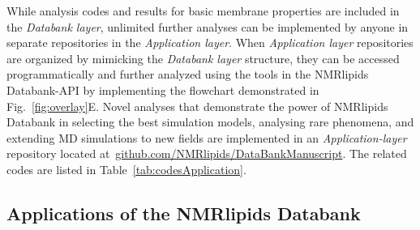 \documentclass[fleqn,10pt]{wlscirep}
\begin{document}
While analysis codes and results for basic membrane properties 
are included in the {\it Databank layer}, unlimited further analyses can be implemented by anyone in separate repositories in the {\it Application layer}. When {\it Application layer} repositories are organized by mimicking the {\it Databank layer} structure, they can be accessed programmatically and further analyzed using the tools in the NMRlipids Databank-API by implementing the flowchart demonstrated in Fig.~\ref{fig:overlay}E. Novel analyses that demonstrate the power of NMRlipids Databank in selecting the best simulation models, analysing rare phenomena, and extending MD simulations to new fields are implemented in an {\it Application-layer} repository located at~\href{https://github.com/NMRlipids/DataBankManuscript}{github.com/NMRlipids/DataBankManuscript}. The related codes are listed in Table~\ref{tab:codesApplication}.


\subsection{Applications of the NMRlipids Databank}
\end{document}
